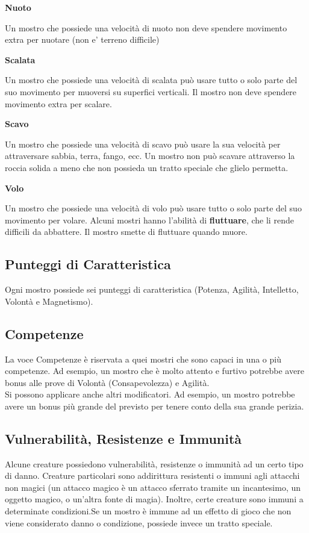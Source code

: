 \medskip\textbf{Nuoto}

Un mostro che possiede una velocità di nuoto non deve spendere movimento extra per nuotare (non e' terreno difficile)

\medskip\textbf{Scalata}

Un mostro che possiede una velocità di scalata può usare tutto o solo parte del suo movimento per muoversi su superfici verticali. Il mostro non deve spendere movimento extra per scalare.

\medskip\textbf{Scavo}

Un mostro che possiede una velocità di scavo può usare la sua velocità per attraversare sabbia, terra, fango, ecc. Un mostro non può scavare attraverso la roccia solida a meno che non possieda un tratto speciale che glielo permetta.

\medskip\textbf{Volo}

Un mostro che possiede una velocità di volo può usare tutto o solo parte del suo movimento per volare. Alcuni mostri hanno l'abilità di \textbf{fluttuare}, che li rende difficili da abbattere. Il mostro smette di fluttuare quando muore.

\subsection{Punteggi di Caratteristica}

Ogni mostro possiede sei punteggi di caratteristica (Potenza, Agilità, Intelletto, Volontà e Magnetismo).

\subsection{Competenze}

La voce Competenze è riservata a quei mostri che sono capaci in una o più competenze. Ad esempio, un mostro che è molto attento e furtivo potrebbe avere bonus alle prove di Volontà (Consapevolezza) e Agilità. \\
Si possono applicare anche altri modificatori. Ad esempio, un mostro potrebbe avere un bonus più grande del previsto per tenere conto della sua grande perizia.

\subsection{Vulnerabilità, Resistenze e Immunità}

Alcune creature possiedono vulnerabilità, resistenze o immunità ad un certo tipo di danno. Creature particolari sono addirittura resistenti o immuni agli attacchi non magici (un attacco magico è un attacco sferrato tramite un incantesimo, un oggetto magico, o un'altra fonte di magia). Inoltre, certe creature sono immuni a determinate condizioni.Se  un mostro è immune ad un effetto di gioco che non viene considerato danno o condizione, possiede invece un tratto speciale.

